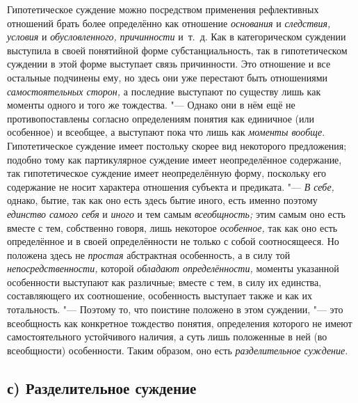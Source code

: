 Гипотетическое суждение можно посредством применения
рефлективных отношений брать более определённо как отношение
{\em основания} и {\em следствия, условия} и {\em обусловленного,}
{\em причинности} и~т.~д.
Как в категорическом суждении выступила в своей понятийной форме
субстанциальность, так в гипотетическом суждении в этой форме выступает
связь причинности. Это отношение и все остальные подчинены ему, но здесь
они уже перестают быть отношениями
{\em самостоятельных сторон,}
а последние выступают по существу лишь как моменты одного и
того же тождества. "--- Однако они в нём ещё не
противопоставлены согласно определениям понятия как единичное (или
особенное) и всеобщее, а выступают пока что лишь как
{\em моменты вообще}.
Гипотетическое суждение имеет постольку скорее вид некоторого
предложения; подобно тому как партикулярное суждение имеет неопределённое
содержание, так гипотетическое суждение имеет неопределённую форму,
поскольку его содержание не носит характера отношения субъекта и
предиката. "--- {\em В себе,}
однако, бытие, так как оно есть здесь бытие иного, есть
именно поэтому {\em единство самого
себя} и {\em иного}
и тем самым
{\em всеобщность;} этим
самым оно есть вместе с тем, собственно говоря, лишь некоторое
{\em особенное,} так как
оно есть определённое и в своей определённости не только с собой
соотносящееся. Но положена здесь не
{\em простая} абстрактная
особенность, а в силу той
{\em непосредственности,}
которой {\em обладают
определённости,} моменты указанной особенности выступают как
различные; вместе с тем, в силу их единства, составляющего их соотношение,
особенность выступает также и как их тотальность. "---
Поэтому то, что поистине положено в этом суждении, "---
это всеобщность как конкретное тождество понятия,
определения которого не имеют самостоятельного устойчивого наличия, а суть
лишь положенные в ней (во всеобщности) особенности. Таким образом, оно есть
{\em разделительное суждение}.

\subsection[с) Разделительное суждение]{с) Разделительное суждение}

